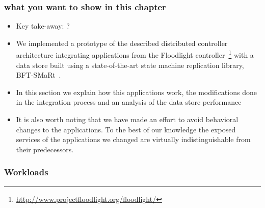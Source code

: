 \label{sec:feasibility:apps}
\glsresetall



\subsubsection{what you want to show in this chapter} 


\begin{itemize}
\item Key take-away: ?

\item  We implemented a prototype of the described distributed controller
architecture integrating applications from the Floodlight
controller~\footnote{\url{http://www.projectfloodlight.org/floodlight/}} with a
data store built using a state-of-the-art state machine replication
library, BFT-SMaRt~\cite{smart-tr,bft-smart:2011:High-perfomance}.

\item  In this section we explain how this applications work, the
  modifications done in the integration process and an analysis of the
  data store performance 

\item It is also worth noting that we have made
an effort to avoid behavioral changes to the applications.
To the best of our knowledge the exposed services of
the applications we changed are virtually indistinguishable
from their predecessors.
\end{itemize}

\subsubsection{Workloads}

